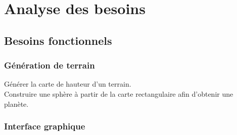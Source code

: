\documentclass[12pt]{report}
\begin{document}
\chapter*{Analyse des besoins}
\setcounter{chapter}{3}






\section{Besoins fonctionnels}

\subsection{Génération de terrain}

Générer la carte de hauteur d'un terrain.\\
Construire une sphère à partir de la carte rectangulaire afin d'obtenir
une planète.


\subsection{Interface graphique}
\end{document}
